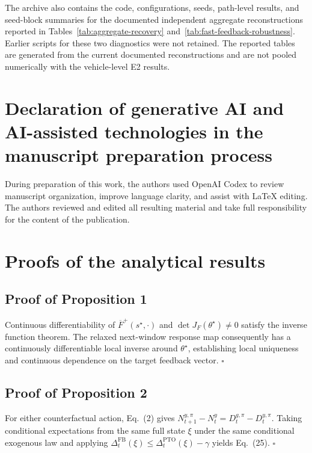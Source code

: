 \documentclass[preprint,12pt,authoryear,a4paper]{elsarticle}
\begin{document}
The archive also contains the code, configurations, seeds, path-level results, and seed-block summaries for the documented independent aggregate reconstructions reported in Tables~\ref{tab:aggregate-recovery} and~\ref{tab:fast-feedback-robustness}. Earlier scripts for these two diagnostics were not retained. The reported tables are generated from the current documented reconstructions and are not pooled numerically with the vehicle-level E2 results.

\section*{Declaration of generative AI and AI-assisted technologies in the manuscript preparation process}

During preparation of this work, the authors used OpenAI Codex to review manuscript organization, improve language clarity, and assist with LaTeX editing. The authors reviewed and edited all resulting material and take full responsibility for the content of the publication.

\appendix
\section{Proofs of the analytical results}
\label{app:proofs}

\subsection*{Proof of Proposition 1}

Continuous differentiability of \(\overline F^{+}(s^\star,\cdot)\) and \(\det J_F(\theta^\star)\ne0\) satisfy the inverse function theorem. The relaxed next-window response map consequently has a continuously differentiable local inverse around \(\theta^\star\), establishing local uniqueness and continuous dependence on the target feedback vector. \(\square\)

\subsection*{Proof of Proposition 2}

For either counterfactual action, Eq.~(2) gives \(N_{t+1}^{y,\pi}-N_t^y=D_t^{g,\pi}-D_t^{y,\pi}\). Taking conditional expectations from the same full state \(\xi\) under the same conditional exogenous law and applying \(\Delta_t^{\mathrm{FB}}(\xi)\le\Delta_t^{\mathrm{PTO}}(\xi)-\gamma\) yields Eq.~(25). \(\square\)
\end{document}
